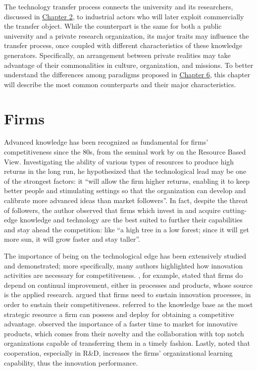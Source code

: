 

\label{Chapter3} %

The technology transfer process connects the university and its researchers, discussed in \hyperref[Chapter2]{Chapter 2}, to industrial actors who will later exploit commercially the transfer object. While the counterpart is the same for both a public university and a private research organization, its major traits may influence the transfer process, once coupled with different characteristics of these knowledge generators. Specifically, an arrangement between private realities may take advantage of their commonalities in culture, organization, and missions. To better understand the differences among paradigms proposed in \hyperref[Chapter6]{Chapter 6}, this chapter will describe the most common counterparts and their major characteristics.

\section{Firms}

Advanced knowledge has been recognized as fundamental for firms' competitiveness since the 80s, from the seminal work by \citet{Wernerfelt1984} on the Resource Based View. Investigating the ability of various types of resources to produce high returns in the long run, he hypothesized that the technological lead may be one of the strongest factors: it \enquote{will allow the firm higher returns, enabling it to keep better people and stimulating settings so that the organization can develop and calibrate more advanced ideas than market followers}. In fact, despite the threat of followers, the author observed that firms which invest in and acquire cutting-edge knowledge and technology are the best suited to further their capabilities and stay ahead the competition: like \enquote{a high tree in a low forest; since it will get more sun, it will grow faster and stay taller}.

The importance of being on the technological edge has been extensively studied and demonstrated; more specifically, many authors highlighted how innovation activities are necessary for competitiveness. \citet{Beath2000}, for example, stated that firms do depend on continual improvement, either in processes and products, whose source is the applied research. \citet{Yusuf2008} argued that firms need to sustain innovation processes, in order to sustain their competitiveness. \citet{Jimenez2011} referred to the knowledge base as the most strategic resource a firm can possess and deploy for obtaining a competitive advantage. \citet{Siegel2003a} observed the importance of a faster time to market for innovative products, which comes from their novelty and the collaboration with top notch organizations capable of transferring them in a timely fashion. Lastly, \citet{AzagraCaro2010} noted that cooperation, especially in R\&D, increases the firms' organizational learning capability, thus the innovation performance. 

